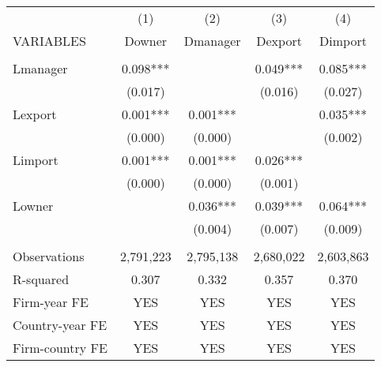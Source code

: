 \begin{tabular}{lcccc} \hline
 & (1) & (2) & (3) & (4) \\
VARIABLES & Downer & Dmanager & Dexport & Dimport \\ \hline
 &  &  &  &  \\
Lmanager & 0.098*** &  & 0.049*** & 0.085*** \\
 & (0.017) &  & (0.016) & (0.027) \\
Lexport & 0.001*** & 0.001*** &  & 0.035*** \\
 & (0.000) & (0.000) &  & (0.002) \\
Limport & 0.001*** & 0.001*** & 0.026*** &  \\
 & (0.000) & (0.000) & (0.001) &  \\
Lowner &  & 0.036*** & 0.039*** & 0.064*** \\
 &  & (0.004) & (0.007) & (0.009) \\
 &  &  &  &  \\
Observations & 2,791,223 & 2,795,138 & 2,680,022 & 2,603,863 \\
R-squared & 0.307 & 0.332 & 0.357 & 0.370 \\
Firm-year FE & YES & YES & YES & YES \\
Country-year FE & YES & YES & YES & YES \\
 Firm-country FE & YES & YES & YES & YES \\ \hline
\end{tabular}
